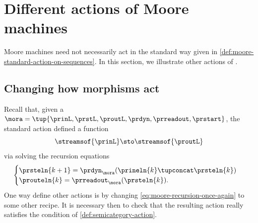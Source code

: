 
\section{Different actions of Moore machines}
\label{sec:different-actions-of-moore-machines}

Moore machines need not necessarily act in the standard way given in \cref{def:moore-standard-action-on-sequences}.
In this section, we illustrate other actions of .

\subsection{Changing how morphisms act}

Recall that, given a ~$\mora = \tup{\prinL,\prstL,\proutL,\prdyn,\prreadout,\prstart}$, the standard action defined a function
\begin{equation}
    \streamsof{\prinL}  \sto \streamsof{\proutL}
\end{equation}
via solving the recursion equations
\begin{equation}
    \label{eq:moore-recursion-once-again}
    \begin{cases}
        \prsteln{k+1} = \prdyn_\mora(\prineln{k} \tupconcat \prsteln{k}) \\
        \prouteln{k} = \prreadout_\mora(\prsteln{k}).
    \end{cases}
\end{equation}
%
One way define other actions is by changing \cref{eq:moore-recursion-once-again} to some other recipe.
It is necessary then to check that the resulting action really satisfies the condition of \cref{def:semicategory-action}.

